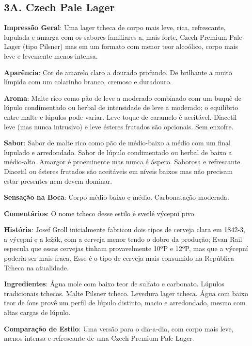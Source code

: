 \subsection*{3A. Czech Pale Lager}
\textbf{Impressão Geral}: Uma lager tcheca de corpo mais leve, rica, refrescante, lupulada e amarga com os sabores familiares a, mais forte, Czech Premium Pale Lager (tipo Pilsner) mas em um formato com menor teor alcoólico, corpo mais leve e levemente menos intensa.

\textbf{Aparência}: Cor de amarelo claro a dourado profundo. De brilhante a muito límpida com um colarinho branco, cremoso e duradouro.

\textbf{Aroma}: Malte rico como pão de leve a moderado combinado com um buquê de lúpulo condimentado ou herbal de intensidade de leve a moderado; o equilíbrio entre malte e lúpulos pode variar. Leve toque de caramelo é aceitável. Diacetil leve (mas nunca intrusivo) e leve ésteres frutados são opcionais. Sem enxofre.

\textbf{Sabor}: Sabor de malte rico como pão de médio-baixo a médio com um final lupulado e arredondado. Sabor de lúpulo condimentado ou herbal de baixo a médio-alto. Amargor é proeminente mas nunca é áspero. Saborosa e refrescante. Diacetil ou ésteres frutados são aceitáveis em níveis baixos mas não precisam estar presentes nem devem dominar.

\textbf{Sensação na Boca}: Corpo médio-baixo e médio. Carbonatação moderada.

\textbf{Comentários}: O nome tcheco desse estilo é svetlé výcepní pivo.

\textbf{História}: Josef Groll inicialmente fabricou dois tipos de cerveja clara em 1842-3, a výcepní e a ležák, com a cerveja menor tendo o dobro da produção; Evan Rail especula que essas cervejas tinham provavelmente 10ºP e 12ºP, mas que a výcepní poderia ser mais fraca. Esse é o tipo de cerveja mais consumido na República Tcheca na atualidade.

\textbf{Ingredientes}: Água mole com baixo teor de sulfato e carbonato. Lúpulos tradicionais tchecos. Malte Pilsner tcheco. Levedura lager tcheca. Água com baixo teor de íons provê um perfil de lúpulo distinto, macio e arredondado, mesmo com altas cargas de lúpulo.

\textbf{Comparação de Estilo}: Uma versão para o dia-a-dia, com corpo mais leve, menos intensa e refrescante de uma Czech Premium Pale Lager.

